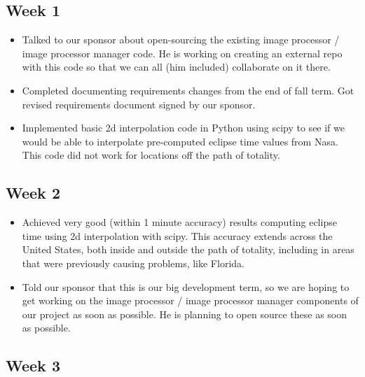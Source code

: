 \documentclass[10pt, onecolumn, draftclsnofoot, letterpaper, compsoc]{IEEEtran}
\begin{document}
\subsection{Week 1}

    \begin{itemize}

	\item Talked to our sponsor about open-sourcing the existing image processor /
		  image processor manager code. He is working on creating an external repo with
		  this code so that we can all (him included) collaborate on it there.

	\item Completed documenting requirements changes from the end of fall term. Got
		  revised requirements document signed by our sponsor.

	\item Implemented basic 2d interpolation code in Python using scipy to see if we
		  would be able to interpolate pre-computed eclipse time values from Nasa.
		  This code did not work for locations off the path of totality.

    \end{itemize}

\subsection{Week 2}

    \begin{itemize}

    \item Achieved very good (within 1 minute accuracy) results computing eclipse time
		  using 2d interpolation with scipy. This accuracy extends across the United
		  States, both inside and outside the path of totality, including in areas that
		  were previously causing problems, like Florida.

	\item Told our sponsor that this is our big development term, so we are hoping to get
		  working on the image processor / image processor manager components of our
		  project as soon as possible. He is planning to open source these as soon as
		  possible.

    \end{itemize}

\subsection{Week 3}
\end{document}
